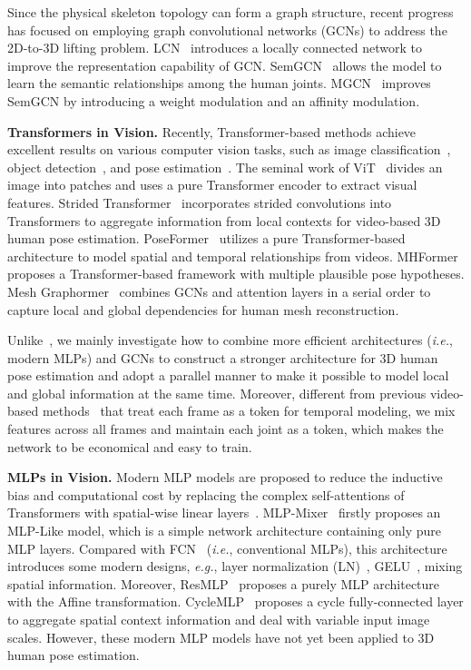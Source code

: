 \documentclass[lettersize,journal]{IEEEtran}
\begin{document}
Since the physical skeleton topology can form a graph structure, recent progress has focused on employing graph convolutional networks (GCNs) to address the 2D-to-3D lifting problem. 
LCN~\cite{ci2019optimizing} introduces a locally connected network to improve
the representation capability of GCN. 
SemGCN~\cite{zhao2019semantic} allows the model to learn the semantic relationships among the human joints. 
MGCN~\cite{zou2021modulated} improves SemGCN by introducing a weight modulation and an affinity modulation. 

\noindent \textbf{Transformers in Vision.}
Recently, Transformer-based methods achieve excellent results on various computer vision tasks, such as image classification~\cite{vit,swin,wang2021pyramid}, object detection~\cite{dert,zhu2020deformable,zhao2022tracking}, and pose estimation~\cite{meshgraphormer,poseformer,strided,mhformer}. 
The seminal work of ViT~\cite{vit} divides an image into  patches and uses a pure Transformer encoder to extract visual features. 
Strided Transformer~\cite{strided} incorporates strided convolutions into Transformers to aggregate information from local contexts for video-based 3D human pose estimation. 
PoseFormer~\cite{poseformer} utilizes a pure Transformer-based architecture to model spatial and temporal relationships from videos. 
MHFormer~\cite{mhformer} proposes a Transformer-based framework with multiple plausible pose hypotheses. 
Mesh Graphormer~\cite{meshgraphormer} combines GCNs and attention layers in a serial order to capture local and global dependencies for human mesh reconstruction. 

Unlike~\cite{meshgraphormer}, we mainly investigate how to combine more efficient architectures (\emph{i.e.}, modern MLPs) and GCNs to construct a stronger architecture for 3D human pose estimation and adopt a parallel manner to make it possible to model local and global information at the same time. 
Moreover, different from previous video-based methods~\cite{poseformer,strided,mhformer} that treat each frame as a token for temporal modeling, we mix features across all frames and maintain each joint as a token, which makes the network to be economical and easy to train. 

\noindent \textbf{MLPs in Vision.}
Modern MLP models are proposed to reduce the inductive bias and computational cost by replacing the complex self-attentions of Transformers with spatial-wise linear layers~\cite{lian2021mlp,liu2021pay,ren2021cascaded,shi2022polyp}. 
MLP-Mixer~\cite{mlpmixer} firstly proposes an MLP-Like model, which is a simple network architecture containing only pure MLP layers. 
Compared with FCN~\cite{simplebaseline} (\emph{i.e.}, conventional MLPs), this architecture introduces some modern designs, \emph{e.g.}, layer normalization (LN)~\cite{ba2016layer}, GELU~\cite{hendrycks2016gaussian}, mixing spatial information. 
Moreover, ResMLP~\cite{touvron2021resmlp} proposes a purely MLP architecture with the Affine transformation. 
CycleMLP~\cite{chen2022cyclemlp} proposes a cycle fully-connected layer to aggregate spatial context information and deal with variable
input image scales. 
However, these modern MLP models have not yet been applied to 3D human pose estimation. 
\end{document}
